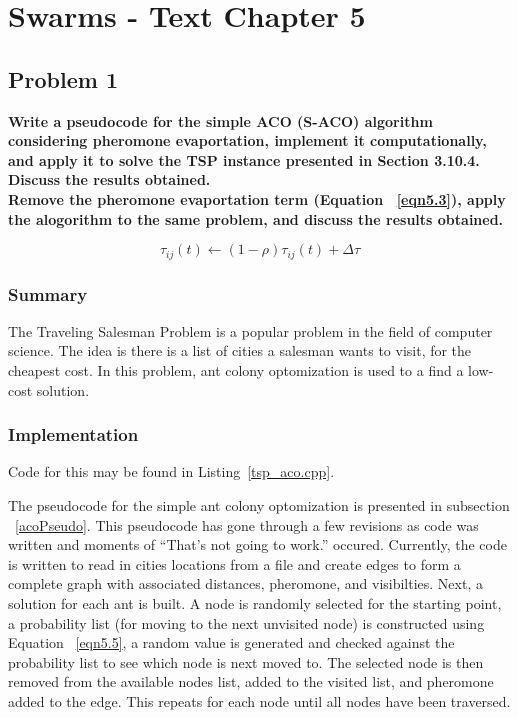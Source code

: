 
\chapter{Swarms - Text Chapter 5}

\section{ Problem 1 }
\textbf{Write a pseudocode for the simple ACO (S-ACO) algorithm considering pheromone evaportation, implement it computationally, and apply it to solve the TSP instance presented in Section 3.10.4. Discuss the results obtained.} \newline \\
\textbf{Remove the pheromone evaportation term (Equation ~\ref{eqn5.3}), apply the alogorithm to the same problem, and discuss the results obtained.}

\begin{equation} \label{eqn5.3}
\tau_{ij}(t) \leftarrow ( 1-\rho ) \tau_{ij}(t) + \Delta \tau
\end{equation}


\subsection{Summary}
The Traveling Salesman Problem is a popular problem in the field of computer science. The idea is there is a list of cities a salesman wants to visit, for the cheapest cost. In this problem, ant colony optomization is used to a find a low-cost solution.

\subsection{Implementation}
Code for this may be found in Listing~\ref{tsp_aco.cpp}.

The pseudocode for the simple ant colony optomization is presented in subsection ~\ref{acoPseudo}. This pseudocode has gone through a few revisions as code was written and moments of ``That's not going to work.'' occured. Currently, the code is written to read in cities locations from a file and create edges to form a complete graph with associated distances, pheromone, and visibilties. Next, a solution for each ant is built. A node is randomly selected for the starting point, a probability list (for moving to the next unvisited node) is constructed using Equation ~\ref{eqn5.5}, a random value is generated and checked against the probability list to see which node is next moved to. The selected node is then removed from the available nodes list, added to the visited list, and pheromone added to the edge. This repeats for each node until all nodes have been traversed.

